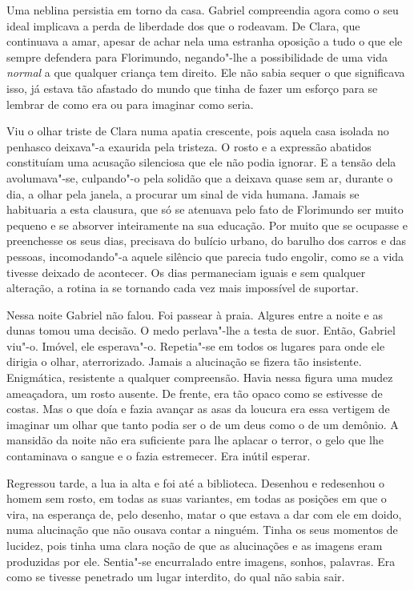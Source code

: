Uma neblina persistia em torno da casa. Gabriel compreendia agora como o
seu ideal implicava a perda de liberdade dos que o rodeavam. De Clara,
que continuava a amar, apesar de achar nela uma estranha oposição a tudo
o que ele sempre defendera para Florimundo, negando"-lhe a possibilidade
de uma vida \emph{normal} a que qualquer criança tem direito. Ele não sabia
sequer o que significava isso, já estava tão afastado do mundo que tinha
de fazer um esforço para se lembrar de como era ou para imaginar como
seria.

Viu o olhar triste de Clara numa apatia crescente, pois aquela casa
isolada no penhasco deixava"-a exaurida pela tristeza. O rosto e a
expressão abatidos constituíam uma acusação silenciosa que ele não podia
ignorar. E a tensão dela avolumava"-se, culpando"-o pela solidão que a
deixava quase sem ar, durante o dia, a olhar pela janela, a procurar um
sinal de vida humana. Jamais se habituaria a esta clausura, que só se
atenuava pelo fato de Florimundo ser muito pequeno e se absorver
inteiramente na sua educação. Por muito que se ocupasse e preenchesse os
seus dias, precisava do bulício urbano, do barulho dos carros e das
pessoas, incomodando"-a aquele silêncio que parecia tudo engolir, como se
a vida tivesse deixado de acontecer. Os dias permaneciam iguais e sem
qualquer alteração, a rotina ia se tornando cada vez mais impossível de
suportar.

Nessa noite Gabriel não falou. Foi passear à praia. Algures entre a
noite e as dunas tomou uma decisão. O medo perlava"-lhe a testa de suor.
Então, Gabriel viu"-o. Imóvel, ele esperava"-o. Repetia"-se em todos os
lugares para onde ele dirigia o olhar, aterrorizado. Jamais a alucinação
se fizera tão insistente. Enigmática, resistente a qualquer compreensão.
Havia nessa figura uma mudez ameaçadora, um rosto ausente. De frente,
era tão opaco como se estivesse de costas. Mas o que doía e fazia
avançar as asas da loucura era essa vertigem de imaginar um olhar que
tanto podia ser o de um deus como o de um demônio. A mansidão da noite
não era suficiente para lhe aplacar o terror, o gelo que lhe contaminava
o sangue e o fazia estremecer. Era inútil esperar.

Regressou tarde, a lua ia alta e foi até a biblioteca. Desenhou e
redesenhou o homem sem rosto, em todas as suas variantes, em todas as
posições em que o vira, na esperança de, pelo desenho, matar o que
estava a dar com ele em doido, numa alucinação que não ousava contar a
ninguém. Tinha os seus momentos de lucidez, pois tinha uma clara noção
de que as alucinações e as imagens eram produzidas por ele. Sentia"-se
encurralado entre imagens, sonhos, palavras. Era como se tivesse
penetrado um lugar interdito, do qual não sabia sair.

